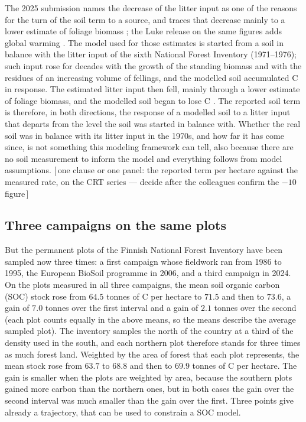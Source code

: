 \documentclass[11pt]{article}
\newcommand{\gap}[1]{\textcolor{red!70!black}{\small[\,#1\,]}}
\begin{document}
The 2025 submission names the decrease of the litter input as one of the reasons for the turn of the soil term to a source, and traces that decrease mainly to a lower estimate of foliage biomass \citep{StatFin2025NID}; the Luke release on the same figures adds global warming \citep{Luke2025news}. The model used for those estimates is started from a soil in balance with the litter input of the sixth National Forest Inventory
(1971--1976); such input rose for decades with the growth of the standing biomass
and with the residues of an increasing volume of fellings, and the modelled soil
accumulated C in response. The estimated litter input then fell, mainly through a
lower estimate of foliage biomass, and the modelled soil began to lose C
\citep{StatFin2025NID}. The reported soil term is therefore, in both directions, the
response of a modelled soil to a litter input that departs from the level the soil was
started in balance with. Whether the real soil was in balance with its litter input in
the 1970s, and how far it has come since, is not something this modeling framework can tell, also because there are
no soil measurement to inform the model and everything follows from model assumptions.
\gap{one clause or one panel: the reported term per hectare against the measured
rate, on the CRT series --- decide after the colleagues confirm the $-10$ figure}

\subsection{Three campaigns on the same plots}
But the permanent plots of the Finnish National Forest
Inventory have been sampled now three times: a first campaign whose fieldwork ran from 1986
to 1995, the European BioSoil programme in 2006, and a third campaign in 2024.  On the
plots measured in all three campaigns, the mean soil organic carbon (SOC) stock rose
from $64.5$ tonnes of C per hectare to $71.5$ and then to $73.6$, a gain of $7.0$ tonnes
over the first interval and a gain of $2.1$ tonnes over the second (each plot counts equally in the above means, so the means describe the average sampled
plot). The inventory samples the north of the country at a third of the density used in
the south, and each northern plot therefore stands for three times as much forest land.
Weighted by the area of forest that each plot represents, the mean stock rose from
$63.7$ to $68.8$ and then to $69.9$ tonnes of C per hectare. The gain is smaller when the
plots are weighted by area, because the southern plots gained more carbon than the
northern ones, but in both cases the gain over the second interval was much smaller than
the gain over the first.
Three points give already a trajectory, that can be used to constrain a SOC model.
\end{document}
